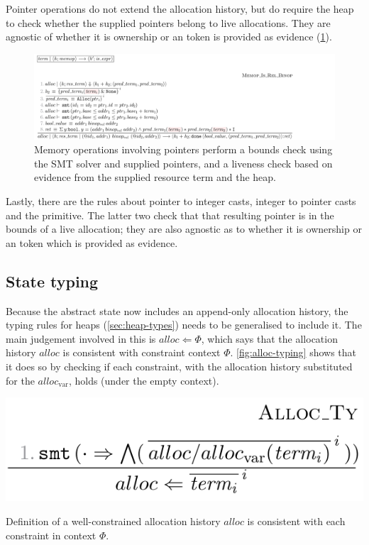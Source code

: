 Pointer operations do not extend the allocation history, but do require the
heap to check whether the supplied pointers belong to live allocations. They
are agnostic of whether it is ownership or an  token is
provided as evidence (\cref{fig:mem-model-dyn-ptr-relop}).

\begin{figure}
    \includegraphics{figures/mem-model-dyn-ptr-relop}
    \caption{Memory operations involving pointers perform a bounds check using
        the SMT solver and supplied pointers, and a liveness check based on
        evidence from the supplied resource term and the heap.}\label{fig:mem-model-dyn-ptr-relop}
\end{figure}

Lastly, there are the rules about pointer to integer casts, integer to pointer
casts and the  primitive. The latter two check that that
resulting pointer is in the bounds of a live allocation; they are also agnostic
as to whether it is ownership or an  token which is provided as
evidence.

\subsection{State typing}

Because the abstract state now includes an append-only allocation history, the
typing rules for heaps (\cref{sec:heap-types}) needs to be generalised to
include it. The main judgement involved in this is $\mathit{alloc} \Leftarrow
\Phi$, which says that the allocation history $\mathit{alloc}$ is consistent
with constraint context $\Phi$. \cref{fig:alloc-typing} shows that it does so
by checking if each constraint, with the allocation history substituted for the
$\mathit{alloc}_\mathrm{var}$, holds (under the empty context).

\begin{marginfigure}
    \includegraphics{figures/alloc-typing}
    \caption{Definition of a well-constrained allocation history \textemdash{}
        $\mathit{alloc}$ is consistent with each constraint in context
        $\Phi$.}\label{fig:alloc-typing}
\end{marginfigure}

